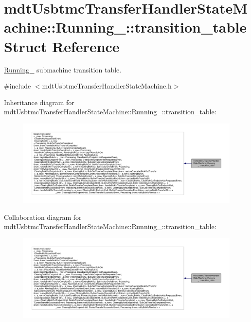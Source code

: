 \hypertarget{structmdt_usbtmc_transfer_handler_state_machine_1_1_running___1_1transition__table}{\section{mdt\-Usbtmc\-Transfer\-Handler\-State\-Machine\-:\-:Running\-\_\-\-:\-:transition\-\_\-table Struct Reference}
\label{structmdt_usbtmc_transfer_handler_state_machine_1_1_running___1_1transition__table}
}


\hyperlink{structmdt_usbtmc_transfer_handler_state_machine_1_1_running__}{Running\-\_\-} submachine transition table.  




{\ttfamily \#include $<$mdt\-Usbtmc\-Transfer\-Handler\-State\-Machine.\-h$>$}



Inheritance diagram for mdt\-Usbtmc\-Transfer\-Handler\-State\-Machine\-:\-:Running\-\_\-\-:\-:transition\-\_\-table\-:
\nopagebreak
\begin{figure}[H]
\begin{center}
\leavevmode
\includegraphics[width=350pt]{structmdt_usbtmc_transfer_handler_state_machine_1_1_running___1_1transition__table__inherit__graph}
\end{center}
\end{figure}


Collaboration diagram for mdt\-Usbtmc\-Transfer\-Handler\-State\-Machine\-:\-:Running\-\_\-\-:\-:transition\-\_\-table\-:
\nopagebreak
\begin{figure}[H]
\begin{center}
\leavevmode
\includegraphics[width=350pt]{structmdt_usbtmc_transfer_handler_state_machine_1_1_running___1_1transition__table__coll__graph}
\end{center}
\end{figure}


